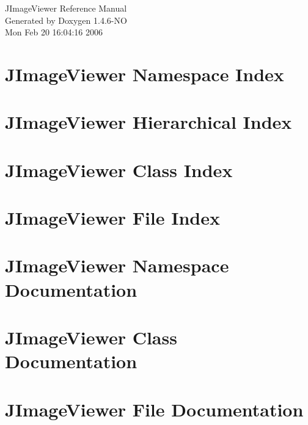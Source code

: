 \documentclass[a4paper]{book}
\begin{document}
\begin{titlepage}
\vspace*{7cm}
\begin{center}
{\Large JImage\-Viewer Reference Manual}\\
\vspace*{1cm}
{\large Generated by Doxygen 1.4.6-NO}\\
\vspace*{0.5cm}
{\small Mon Feb 20 16:04:16 2006}\\
\end{center}
\end{titlepage}
\clearemptydoublepage
{}
\tableofcontents
\clearemptydoublepage
{}
\chapter{JImage\-Viewer Namespace Index}

\chapter{JImage\-Viewer Hierarchical Index}

\chapter{JImage\-Viewer Class Index}

\chapter{JImage\-Viewer File Index}

\chapter{JImage\-Viewer Namespace Documentation}

\chapter{JImage\-Viewer Class Documentation}



\chapter{JImage\-Viewer File Documentation}



\printindex
\end{document}
